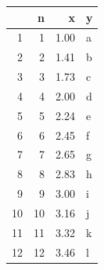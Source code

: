\begin{longtable}{rrrl}
  \hline
 & n & x & y \\ 
  \hline
1 &   1 & 1.00 & a \\ 
  2 &   2 & 1.41 & b \\ 
  3 &   3 & 1.73 & c \\ 
  4 &   4 & 2.00 & d \\ 
  5 &   5 & 2.24 & e \\ 
  6 &   6 & 2.45 & f \\ 
  7 &   7 & 2.65 & g \\ 
  8 &   8 & 2.83 & h \\ 
  9 &   9 & 3.00 & i \\ 
  10 &  10 & 3.16 & j \\ 
  11 &  11 & 3.32 & k \\ 
  12 &  12 & 3.46 & l \\ 
   \hline
\hline
\end{longtable}
